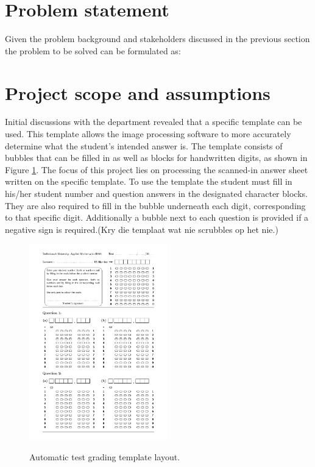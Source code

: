 \section{Problem statement}
\label{sec:problemStatement}

Given the problem background and stakeholders discussed in the previous section the problem to be solved can be formulated as:
\newline
\newline
\noindent{}

\section{Project scope and assumptions}\label{sec:Scope}
Initial discussions with the department revealed that a specific template can be used. This template allows the image processing software to more accurately determine what the student's intended answer is. The template consists of bubbles that can be filled in as well as blocks for handwritten digits, as shown in Figure \ref{fig:NumbersTemplate}. The focus of this project lies on processing the scanned-in answer sheet written on the specific template. To use the template the student must fill in his/her student number and question answers in the designated character blocks. They are also required to fill in the bubble underneath each digit, corresponding to that specific digit. Additionally a bubble next to each question is provided if a negative sign is required.(Kry die templaat wat nie scrubbles op het nie.)


\begin{figure}
  \centering
  \includegraphics[width=6cm]{NumbersTemplate}\\
  \caption{Automatic test grading template layout.}
  \label{fig:NumbersTemplate}
\end{figure}


